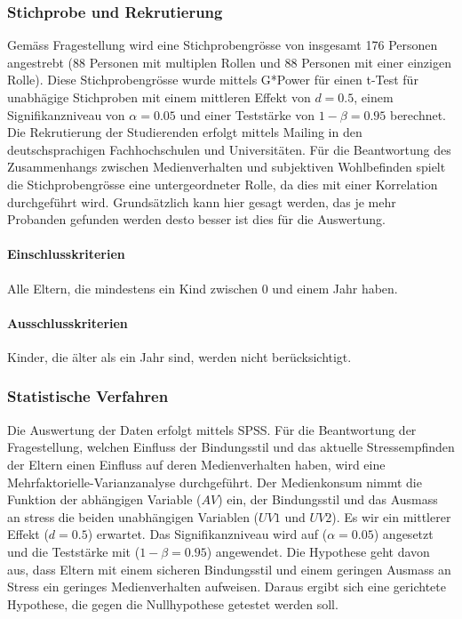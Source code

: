 \subsubsection{Stichprobe und Rekrutierung}
Gemäss Fragestellung wird eine Stichprobengrösse von insgesamt 176 Personen angestrebt (88 Personen mit multiplen Rollen und 88 Personen mit einer einzigen Rolle). Diese Stichprobengrösse wurde mittels G*Power für einen t-Test für unabhägige Stichproben mit einem mittleren Effekt von $d = 0.5$, einem Signifikanzniveau von $\alpha=0.05$ und einer Teststärke von $1-\beta=0.95$ berechnet. Die Rekrutierung der Studierenden erfolgt mittels Mailing in den deutschsprachigen Fachhochschulen und Universitäten.
Für die Beantwortung des Zusammenhangs zwischen Medienverhalten und subjektiven Wohlbefinden spielt die Stichprobengrösse eine untergeordneter Rolle, da dies mit einer Korrelation durchgeführt wird. Grundsätzlich kann hier gesagt werden, das je mehr Probanden gefunden werden desto besser ist dies für die Auswertung. 
\paragraph{Einschlusskriterien}
Alle Eltern, die mindestens ein Kind zwischen 0 und einem Jahr haben.
\paragraph{Ausschlusskriterien}
Kinder, die älter als ein Jahr sind, werden nicht berücksichtigt.
\subsubsection{Statistische Verfahren}
Die Auswertung der Daten erfolgt mittels SPSS. 
Für die Beantwortung der Fragestellung, welchen Einfluss der Bindungsstil und das aktuelle Stressempfinden der Eltern einen Einfluss auf deren Medienverhalten haben, wird eine Mehrfaktorielle-Varianzanalyse durchgeführt. Der Medienkonsum nimmt die Funktion der abhängigen Variable ($AV$) ein, der Bindungsstil und das Ausmass an stress die beiden unabhängigen Variablen ($UV1$ und $UV2$). Es wir ein mittlerer Eﬀekt ($d=0.5$) erwartet. Das Signiﬁkanzniveau wird auf ($\alpha=0.05$) angesetzt und die Teststärke mit ($1-\beta=0.95$) angewendet.
Die Hypothese geht davon aus, dass Eltern mit einem sicheren Bindungsstil und einem geringen Ausmass an Stress ein geringes Medienverhalten aufweisen. Daraus ergibt sich eine gerichtete Hypothese, die gegen die Nullhypothese getestet werden soll.

